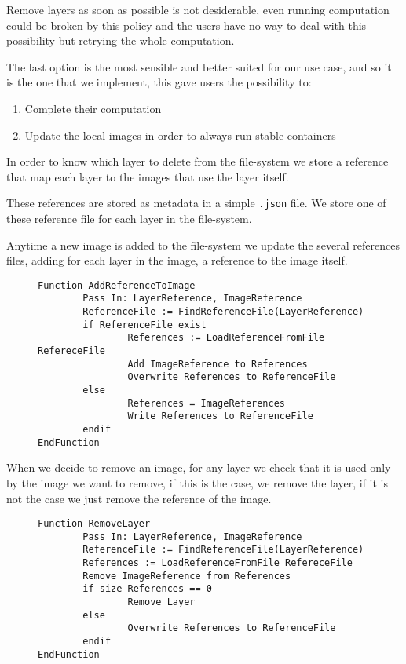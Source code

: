 Remove layers as soon as possible is not desiderable, even running computation
could be broken by this policy and the users have no way to deal with this
possibility but retrying the whole computation.

The last option is the most sensible and better suited for our use case, and so
it is the one that we implement, this gave users the possibility to:
\begin{enumerate}
\item Complete their computation
\item Update the local images in order to always run stable containers
\end{enumerate}

In order to know which layer to delete from the file-system we store a reference
that map each layer to the images that use the layer itself.

These references are stored as metadata in a simple \texttt{.json} file.  We
store one of these reference file for each layer in the file-system.

Anytime a new image is added to the file-system we update the several
references files, adding for each layer in the image, a reference to the image
itself.

\begin{figure}
\begin{lstlisting}[caption={Algorithm to add an image reference to the layer metadata}, label={lst:add-image-reference-to-layer}]
Function AddReferenceToImage
        Pass In: LayerReference, ImageReference
        ReferenceFile := FindReferenceFile(LayerReference)
        if ReferenceFile exist
                References := LoadReferenceFromFile RefereceFile
                Add ImageReference to References
                Overwrite References to ReferenceFile
        else 
                References = ImageReferences
                Write References to ReferenceFile
        endif
EndFunction
\end{lstlisting}
\end{figure}

When we decide to remove an image, for any layer we check that it is used only
by the image we want to remove, if this is the case, we remove the layer, if it
is not the case we just remove the reference of the image.

\begin{figure}
\begin{lstlisting}[caption={Algorithm to remove an image from the file-system}, label={lst:remove-layer}]
Function RemoveLayer
        Pass In: LayerReference, ImageReference
        ReferenceFile := FindReferenceFile(LayerReference)
        References := LoadReferenceFromFile RefereceFile
        Remove ImageReference from References
        if size References == 0
                Remove Layer
        else
                Overwrite References to ReferenceFile
        endif
EndFunction
\end{lstlisting}
\end{figure}

